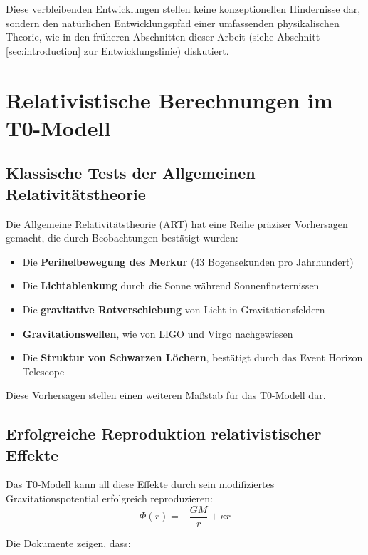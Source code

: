 \documentclass[12pt,a4paper]{article}
\begin{document}
	Diese verbleibenden Entwicklungen stellen keine konzeptionellen Hindernisse dar, sondern den natürlichen Entwicklungspfad einer umfassenden physikalischen Theorie, wie in den früheren Abschnitten dieser Arbeit (siehe Abschnitt \ref{sec:introduction} zur Entwicklungslinie) diskutiert.
	
	\section{Relativistische Berechnungen im T0-Modell}
	\label{sec:relativistic_calculations}
	
	\subsection{Klassische Tests der Allgemeinen Relativitätstheorie}
	\label{subsec:gr_tests}
	
	Die Allgemeine Relativitätstheorie (ART) hat eine Reihe präziser Vorhersagen gemacht, die durch Beobachtungen bestätigt wurden:
	
	\begin{itemize}
		\item Die \textbf{Perihelbewegung des Merkur} (43 Bogensekunden pro Jahrhundert)
		\item Die \textbf{Lichtablenkung} durch die Sonne während Sonnenfinsternissen
		\item Die \textbf{gravitative Rotverschiebung} von Licht in Gravitationsfeldern
		\item \textbf{Gravitationswellen}, wie von LIGO und Virgo nachgewiesen
		\item Die \textbf{Struktur von Schwarzen Löchern}, bestätigt durch das Event Horizon Telescope
	\end{itemize}
	
	Diese Vorhersagen stellen einen weiteren Maßstab für das T0-Modell dar.
	
	\subsection{Erfolgreiche Reproduktion relativistischer Effekte}
	\label{subsec:gr_reproduction}
	
	Das T0-Modell kann all diese Effekte durch sein modifiziertes Gravitationspotential erfolgreich reproduzieren:
	\begin{equation}
		\Phi(r) = -\frac{GM}{r} + \kappa r
	\end{equation}
	
	Die Dokumente zeigen, dass:
	
\end{document}

